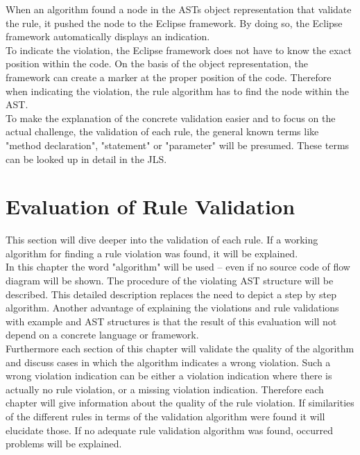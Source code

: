 When an algorithm found a node in the \ac{AST}s object representation that validate the rule, it pushed the node to the Eclipse framework. By doing so, the Eclipse framework automatically displays an indication. 
\\

To indicate the violation, the Eclipse framework does not have to know the exact position within the code. On the basis of the object representation, the framework can create a marker at the proper position of the code. Therefore when indicating the violation, the rule algorithm has to find the node within the \ac{AST}.
\\

To make the explanation of the concrete validation easier and to focus on the actual challenge, the validation of each rule, the general known terms like "method declaration", "statement" or "parameter" will be presumed. These terms can be looked up in detail in the \ac{JLS}\cite{jls}. 

\section{Evaluation of Rule Validation}
\label{e:evaluation}
This section will dive deeper into the validation of each rule. If a working algorithm for finding a rule violation was found, it will be explained.
\\

In this chapter the word "algorithm" will be used -- even if no source code of flow diagram will be shown. The procedure of the violating \ac{AST}  structure will be described. This detailed description replaces the need to depict a step by step algorithm. Another advantage of explaining the violations and rule validations with example and \ac{AST} structures is that the result of this evaluation will not depend on a concrete language or framework. 
\\

Furthermore each section of this chapter will validate the quality of the algorithm and discuss cases in which the algorithm indicates a wrong violation. Such a wrong violation indication can be either a violation indication where there is actually no rule violation, or a missing violation indication. Therefore each chapter will give information about the quality of the rule violation. If similarities of the different rules in terms of the validation algorithm were found it will elucidate those. If no adequate rule validation algorithm was found, occurred problems will be explained.
\\

